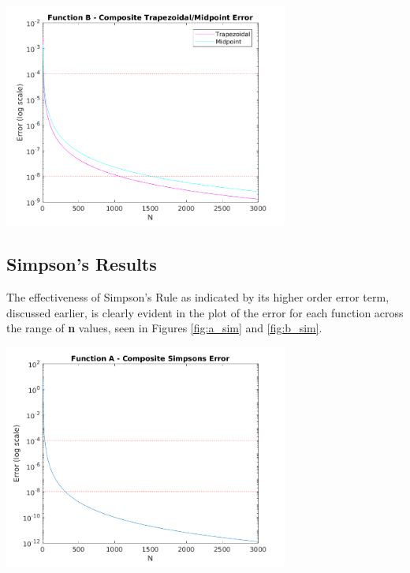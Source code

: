 \documentclass{article}
\begin{document}
\begin{center}
	\includegraphics[width=0.7\textwidth]{../output/b_trapezoidal_midpoint.png}
	\label{fig:b_trap_mid}
\end{center}


\subsection{Simpson's Results}\label{results:sim}

The effectiveness of Simpson's Rule as indicated by its higher order error term, discussed earlier, is clearly evident in the plot of the error for each function across the range of \textbf{n} values, seen in Figures \ref{fig:a_sim} and \ref{fig:b_sim}.

\begin{center}
	\includegraphics[width=0.7\textwidth]{../output/a_simpsons.png}
	\label{fig:a_sim}
\end{center}
\end{document}
